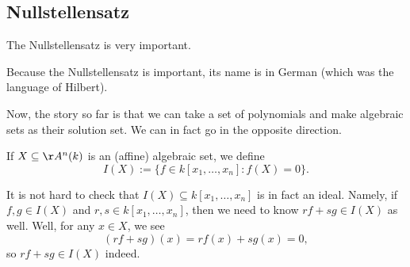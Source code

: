 \subsection{Nullstellensatz}
The Nullstellensatz is very important.
\begin{remark}
	Because the Nullstellensatz is important, its name is in German (which was the language of Hilbert).
\end{remark}

Now, the story so far is that we can take a set of polynomials and make algebraic sets as their solution set. We can in fact go in the opposite direction.
\begin{definition}[\texorpdfstring{$I(X)$}{I(X)}]
	If $X\subseteq\AA^n(k)$ is an (affine) algebraic set, we define
	\[I(X):=\{f\in k[x_1,\ldots,x_n]:f(X)=0\}.\]
\end{definition}
It is not hard to check that $I(X)\subseteq k[x_1,\ldots,x_n]$ is in fact an ideal. Namely, if $f,g\in I(X)$ and $r,s\in k[x_1,\ldots,x_n]$, then we need to know $rf+sg\in I(X)$ as well. Well, for any $x\in X$, we see
\[(rf+sg)(x)=rf(x)+sg(x)=0,\]
so $rf+sg\in I(X)$ indeed.


